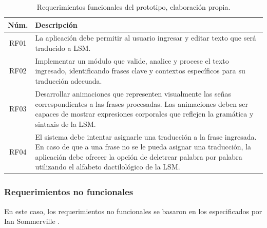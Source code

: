 \begin{table}[H]
	\centering
	\renewcommand{\arraystretch}{1.6}
	\setlength{\tabcolsep}{5pt}
	\begin{adjustbox}{max width=\linewidth}
		\normalsize
		\begin{tabular}{|c|p{13.5cm}|}
			\hline
			\textbf{Núm.} & \textbf{Descripción} \\ \hline
			
			RF01 & La aplicación debe permitir al usuario ingresar y editar texto que será traducido a LSM. \\ \hline
			
			RF02 & Implementar un módulo que valide, analice y procese el texto ingresado, identificando frases clave y contextos específicos para su traducción adecuada. \\ \hline
			
			RF03 & Desarrollar animaciones que representen visualmente las señas correspondientes a las frases procesadas. Las animaciones deben ser capaces de mostrar expresiones corporales que reflejen la gramática y sintaxis de la LSM. \\ \hline
			
			RF04 & El sistema debe intentar asignarle una traducción a la frase ingresada. En caso de que a una frase no se le pueda asignar una traducción, la aplicación debe ofrecer la opción de deletrear palabra por palabra utilizando el alfabeto dactilológico de la LSM. \\ \hline
			
		\end{tabular}
	\end{adjustbox}
	\caption[Requerimientos funcionales del prototipo]{Requerimientos funcionales del prototipo, elaboración propia.}
	\label{tab:requerimientos_funcionales}
\end{table}

\newpage
\subsubsection{Requerimientos no funcionales}
En este caso, los requerimientos no funcionales se basaron en los especificados por Ian Sommerville \cite{ref78}.

